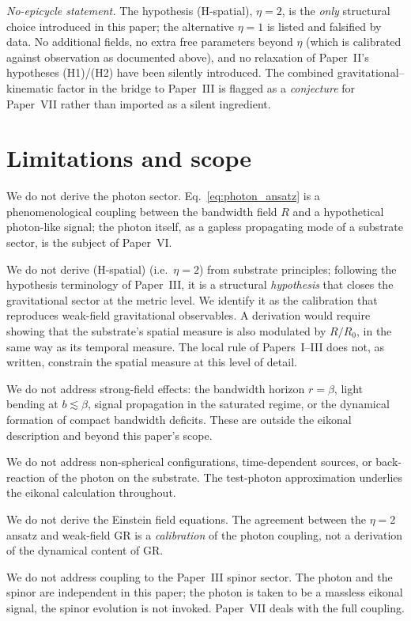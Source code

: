 \documentclass[11pt,a4paper]{article}
\begin{document}
\noindent\emph{No-epicycle statement.} The hypothesis
(H-spatial), $\eta = 2$, is the \emph{only} structural choice
introduced in this paper; the alternative $\eta = 1$ is
listed and falsified by data. No additional fields, no extra
free parameters beyond $\eta$ (which is calibrated against
observation as documented above), and no relaxation of
Paper~II's hypotheses (H1)/(H2) have been silently introduced.
The combined gravitational--kinematic factor in the bridge
to Paper~III is flagged as a \emph{conjecture} for Paper~VII
rather than imported as a silent ingredient.

\section{Limitations and scope}
\label{sec:not}

We do not derive the photon sector. Eq.~\eqref{eq:photon_ansatz}
is a phenomenological coupling between the bandwidth field $R$
and a hypothetical photon-like signal; the photon itself, as a
gapless propagating mode of a substrate sector, is the subject
of Paper~VI.

We do not derive (H-spatial) (i.e.\ $\eta = 2$) from
substrate principles; following the hypothesis terminology of
Paper~III, it is a structural \emph{hypothesis} that closes the
gravitational sector at the metric level. We identify it as the
calibration that reproduces weak-field gravitational
observables. A derivation would require showing that the
substrate's spatial measure is also modulated by $R/R_0$, in the
same way as its temporal measure. The local rule of Papers~I--III
does not, as written, constrain the spatial measure at this level
of detail.

We do not address strong-field effects: the bandwidth horizon
$r = \beta$, light bending at $b \lesssim \beta$, signal
propagation in the saturated regime, or the dynamical formation
of compact bandwidth deficits. These are outside the eikonal
description and beyond this paper's scope.

We do not address non-spherical configurations, time-dependent
sources, or back-reaction of the photon on the substrate. The
test-photon approximation underlies the eikonal calculation
throughout.

We do not derive the Einstein field equations. The agreement
between the $\eta = 2$ ansatz and weak-field GR is a
\emph{calibration} of the photon coupling, not a derivation of
the dynamical content of GR.

We do not address coupling to the Paper~III spinor sector. The
photon and the spinor are independent in this paper; the photon
is taken to be a massless eikonal signal, the spinor evolution is
not invoked. Paper~VII deals with the full coupling.
\end{document}
